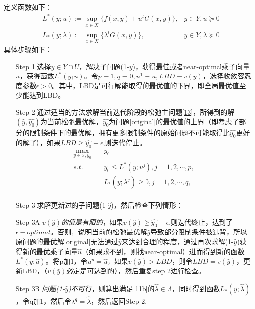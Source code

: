 \documentclass[UTF8,a4]{article}
\begin{document}
定义函数如下：
\begin{subequations}
\begin{align}
\label{12a}
&L^*(y;u):=\sup_{x\in X}\{f(x,y)+u^tG(x,y)\},&y\in Y,u\succeq 0\\
\label{12b}
&L_*(y;\lambda):=\sup_{x\in X}\{\lambda^tG(x,y)\},&y\in Y,\lambda\succeq0
\end{align}
\end{subequations}
具体步骤如下：
\begin{itemize}
\item[Step 1]选择$\bar{y}\in Y\cap U $，解决子问题(1-$\bar{y}$)，获得最佳或者near-optimal乘子向量$\bar{u}$，获得函数$L^*(y;\bar{u})$。令$p=1,q=0,u^1=\bar{u},LBD=v(\bar{y})$，选择收敛容忍度参数$\epsilon>0$。其中，LBD是可行解能取得的最优值的下界，即全局最优值至少能达到LBD。
\item[Step 2]通过适当的方法求解当前迭代阶段的松弛主问题\eqref{13}，所得到的解$(\hat{y},\hat{y_0})$为当前松弛最优解，$\hat{y_0}$为问题\eqref{original}的最优值的上界（即考虑了部分的限制条件下的最优解，拥有更多限制条件的原始问题不可能取得比$\hat{y_0}$更好的解了），如果$LBD\geqslant\hat{y_0}-\epsilon$,则迭代停止。
\begin{equation}
\label{13}
\begin{split}
\max_{y\in Y,y_0}\quad&y_0\\
s.t.\quad&y_0\leqslant L^*(y;u^j), j=1,2,\cdots,p,\\
&L_*(y;\lambda^j)\geqslant 0, j=1,2,\cdots,q,\\
\end{split}
\end{equation}
\item[Step 3]求解更新过的子问题(1-$\hat{y}$)，然后检查下列情形：
\item[Step 3A]\emph{$v(\hat{y})$的值是有限的}，如果$v(\hat{y}) \geqslant \hat{y_0} - \epsilon$,则迭代终止，达到了$\epsilon-optimal$。否则，说明当前的松弛最优解$\hat{y}$导致部分限制条件被违背，所以原问题的最优解\eqref{original}无法通过$\hat{y}$来达到合理的程度，通过再次求解(1-$\hat{y}$)获得新的最优乘子向量$\hat{u}$（如果求不到，则找near-optimal）进而得到新的函数$L^*(y;\hat{u})$。将p加1，令$u^p=\hat{u}$，如果$v(\hat{y})>LBD$，则令$LBD=v(\hat{y})$，更新LBD，（$v(\hat{y})$必定是可达到的），然后重复step 2进行检查。
\item[Step 3B]\emph{问题(1-$\hat{y}$)不可行}，则算出满足\eqref{11b}的$\hat{\lambda}\in\Lambda$，同时得到函数$L_*(y;\hat{\lambda})$，令q加1，然后令$\lambda^q=\hat{\lambda}$，然后返回Step 2.
\end{itemize}
\end{document}
